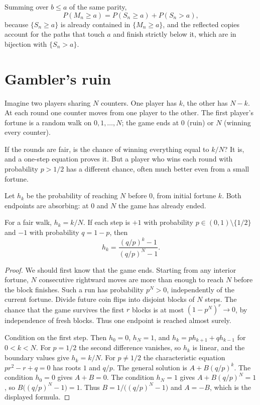 Summing over $b\le a$ of the same parity,
\[
 P(M_n\ge a)=P(S_n\ge a)+P(S_n>a),
\]
because $\{S_n\ge a\}$ is already contained in $\{M_n\ge a\}$, and the reflected copies account for the paths that touch $a$ and finish strictly below it, which are in bijection with $\{S_n>a\}$.

\section{Gambler's ruin}

Imagine two players sharing $N$ counters. One player has $k$, the other has $N-k$. At each round one counter moves from one player to the other. The first player's fortune is a random walk on $0,1,\ldots,N$; the game ends at $0$ (ruin) or $N$ (winning every counter).

If the rounds are fair, is the chance of winning everything equal to $k/N$? It is, and a one-step equation proves it. But a player who wins each round with probability $p>1/2$ has a different chance, often much better even from a small fortune.

Let $h_k$ be the probability of reaching $N$ before $0$, from initial fortune $k$. Both endpoints are absorbing: at $0$ and $N$ the game has already ended.

\begin{theorem}[ruin]\label{thm:ruin}
For a fair walk, $h_k=k/N$. If each step is $+1$ with probability $p\in(0,1)\setminus\{1/2\}$ and $-1$ with probability $q=1-p$, then
\[
 h_k=\frac{(q/p)^k-1}{(q/p)^N-1}.
\]
\end{theorem}
\begin{proof}
We should first know that the game ends. Starting from any interior fortune, $N$ consecutive rightward moves are more than enough to reach $N$ before the block finishes. Such a run has probability $p^N>0$, independently of the current fortune. Divide future coin flips into disjoint blocks of $N$ steps. The chance that the game survives the first $r$ blocks is at most $(1-p^N)^r\to0$, by independence of fresh blocks. Thus one endpoint is reached almost surely.

Condition on the first step. Then $h_0=0$, $h_N=1$, and $h_k=p h_{k+1}+q h_{k-1}$ for $0<k<N$. For $p=1/2$ the second difference vanishes, so $h_k$ is linear, and the boundary values give $h_k=k/N$. For $p\ne1/2$ the characteristic equation $p r^2-r+q=0$ has roots $1$ and $q/p$. The general solution is $A+B(q/p)^k$. The condition $h_0=0$ gives $A+B=0$. The condition $h_N=1$ gives $A+B(q/p)^N=1$, so $B\bigl((q/p)^N-1\bigr)=1$. Thus $B=1/\bigl((q/p)^N-1\bigr)$ and $A=-B$, which is the displayed formula.
\end{proof}

